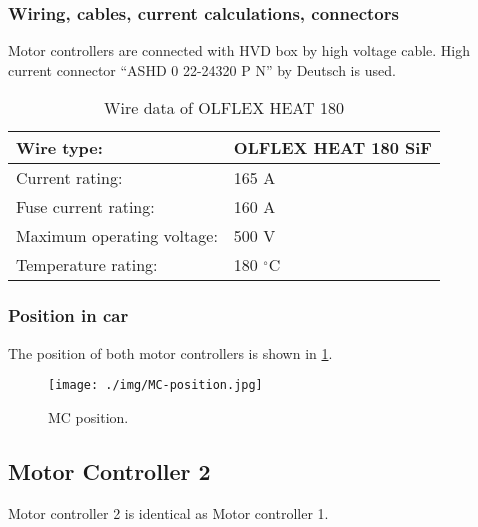 \subsubsection{Wiring, cables, current calculations, connectors}

Motor controllers are connected with HVD box by high voltage cable. High current connector “ASHD 0 22-24320 P N” by Deutsch is used. 

\begin{table}[H]
	\centering
	\caption{Wire data of OLFLEX HEAT 180}
	\begin{tabularx}{\textwidth}{|X|X|}\hline
		Wire type: & OLFLEX HEAT 180 SiF  \\[\TableSize]\hline
		Current rating: & 165 A \\[\TableSize]\hline
		Fuse current rating: & 160 A \\[\TableSize]\hline
		Maximum operating voltage: & 500 V \\[\TableSize]\hline
		Temperature rating: & 180 $^\circ$C \\[\TableSize]\hline
	\end{tabularx}%
	\label{tab:MC:wire}%
\end{table}%

\subsubsection{Position in car}

The position of both motor controllers is shown in \ref{fig:MC:position}.

\begin{figure}[H]
	\centering
	\texttt{[image: ./img/MC-position.jpg]}
	\caption{MC position.}
	\label{fig:MC:position}
\end{figure}
\subsection{Motor Controller 2}
Motor controller 2 is identical as Motor controller 1.




